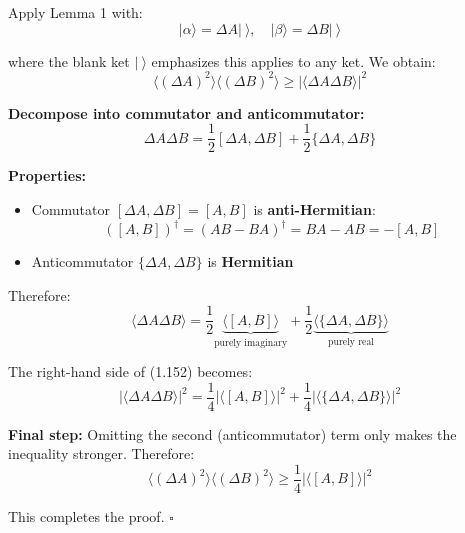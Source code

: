 \documentclass[11pt,a4paper]{article}
\begin{document}
Apply Lemma 1 with:
\begin{equation}
|\alpha\rangle = \Delta A|~\rangle, \quad |\beta\rangle = \Delta B|~\rangle
\tag{1.151}
\end{equation}

where the blank ket $|~\rangle$ emphasizes this applies to any ket. We obtain:
\begin{equation}
\langle(\Delta A)^2\rangle\langle(\Delta B)^2\rangle \geq |\langle\Delta A\Delta B\rangle|^2
\tag{1.152}
\end{equation}

\textbf{Decompose into commutator and anticommutator:}
\begin{equation}
\Delta A\Delta B = \frac{1}{2}[\Delta A, \Delta B] + \frac{1}{2}\{\Delta A, \Delta B\}
\tag{1.153}
\end{equation}

\textbf{Properties:}
\begin{itemize}
\item Commutator $[\Delta A, \Delta B] = [A, B]$ is \textbf{anti-Hermitian}:
\begin{equation}
([A,B])^\dagger = (AB - BA)^\dagger = BA - AB = -[A,B]
\tag{1.154}
\end{equation}

\item Anticommutator $\{\Delta A, \Delta B\}$ is \textbf{Hermitian}
\end{itemize}

Therefore:
\begin{equation}
\langle\Delta A\Delta B\rangle = \frac{1}{2}\underbrace{\langle[A,B]\rangle}_{\text{purely imaginary}} + \frac{1}{2}\underbrace{\langle\{\Delta A, \Delta B\}\rangle}_{\text{purely real}}
\tag{1.155}
\end{equation}

The right-hand side of (1.152) becomes:
\begin{equation}
|\langle\Delta A\Delta B\rangle|^2 = \frac{1}{4}|\langle[A,B]\rangle|^2 + \frac{1}{4}|\langle\{\Delta A, \Delta B\}\rangle|^2
\tag{1.156}
\end{equation}

\textbf{Final step:}
Omitting the second (anticommutator) term only makes the inequality stronger. Therefore:
\begin{equation}
\boxed{\langle(\Delta A)^2\rangle\langle(\Delta B)^2\rangle \geq \frac{1}{4}|\langle[A,B]\rangle|^2}
\end{equation}

This completes the proof. $\square$
\end{document}
